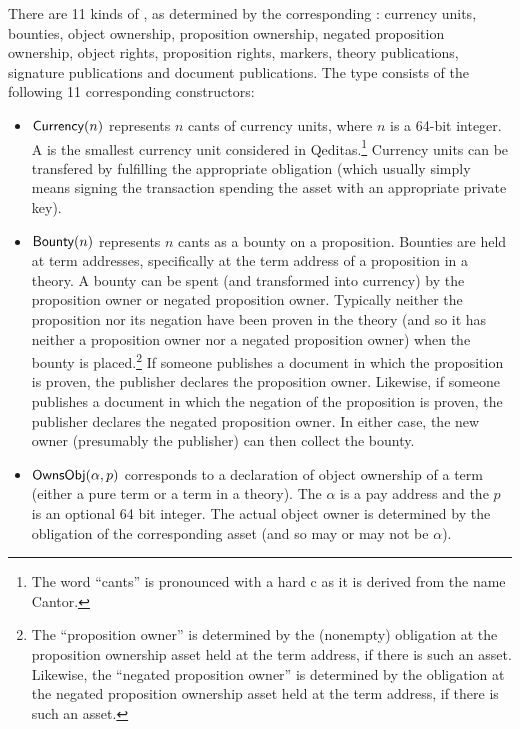 There are 11 kinds of {}, as determined
by the corresponding {}: currency units, bounties, object ownership,
proposition ownership, negated proposition ownership,
object rights, proposition rights, markers,
theory publications, signature publications and document publications.
The type {} consists of the following 11 corresponding constructors:
\begin{itemize}
\item ${\constr{Currency}}(n)$ represents $n$ cants of currency units, where $n$ is a 64-bit integer.
A {} is the smallest currency unit considered in Qeditas.\footnote{The word ``cants'' is pronounced with a hard c as it is derived from the name Cantor.}
Currency units can be transfered by fulfilling the appropriate obligation (which usually simply
means signing the transaction spending the asset with an appropriate private key).
\item ${\constr{Bounty}}(n)$ represents $n$ cants as a bounty on a proposition.
Bounties are held at term addresses, specifically at the term address of a proposition in a theory.
A bounty can be spent (and transformed into currency) by the proposition owner 
or negated proposition owner.
Typically neither the proposition nor its negation have been proven in the theory
(and so it has neither a proposition owner nor a negated proposition owner)
when the bounty is placed.\footnote{The ``proposition owner'' is determined by the (nonempty) obligation at the proposition ownership asset held at the term address, if there is such an asset. Likewise, the ``negated proposition owner'' is determined by the obligation at the negated proposition ownership asset held at the term address, if there is such an asset.}
If someone publishes a document in which the proposition is proven,
the publisher declares the proposition owner.
Likewise, if someone publishes a document in which the negation of the proposition is proven,
the publisher declares the negated proposition owner.
In either case, the new owner (presumably the publisher) can then collect the bounty.
\item ${\constr{OwnsObj}}(\alpha,p)$ corresponds to a declaration of object ownership of a term (either
a pure term or a term in a theory).
The $\alpha$ is a pay address and the $p$ is an optional 64 bit integer.
The actual object owner is determined by the obligation of the corresponding asset (and so may
or may not be $\alpha$).

\end{itemize}
